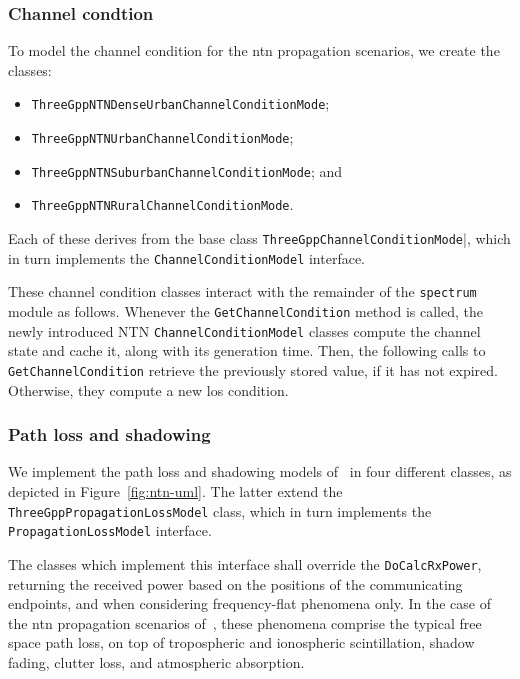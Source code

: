 \subsubsection{Channel condtion}
To model the channel condition for the \gls{ntn} propagation scenarios, we create the classes: 
\begin{itemize}
    \item \verb|ThreeGppNTNDenseUrbanChannelConditionMode|;
    \item \verb|ThreeGppNTNUrbanChannelConditionMode|;
    \item \verb|ThreeGppNTNSuburbanChannelConditionMode|; and
    \item \verb|ThreeGppNTNRuralChannelConditionMode|.
\end{itemize}
Each of these derives from the base class \texttt{Three\-Gpp\-Channel\-Condition\-Mode}|, which in turn implements the \texttt{Channel\-Condition\-Model} interface.

These channel condition classes interact with the remainder of the \texttt{spectrum} module as follows.
Whenever the \texttt{Get\-Channel\-Condition} method is called, the newly introduced NTN \texttt{Channel\-Condition\-Model} classes compute the channel state and cache it, along with its generation time. Then, the following calls to \texttt{Get\-Channel\-Condition} retrieve the previously stored value, if it has not expired. Otherwise, they compute a new \gls{los} condition. 

\subsubsection{Path loss and shadowing}
We implement the path loss and shadowing models of~\cite{38811} in four different classes, as depicted in Figure~\ref{fig:ntn-uml}. The latter extend the \texttt{Three\-Gpp\-Propagation\-Loss\-Model} class, which in turn implements the \texttt{Propagation\-Loss\-Model} interface.

The classes which implement this interface shall override the \texttt{Do\-Calc\-Rx\-Power}, returning the received power based on the positions of the communicating endpoints, and when considering frequency-flat phenomena only. 
In the case of the \gls{ntn} propagation scenarios of~\cite{38811}, these phenomena comprise the typical free space path loss, on top of tropospheric and ionospheric scintillation, shadow fading, clutter loss, and atmospheric absorption.

